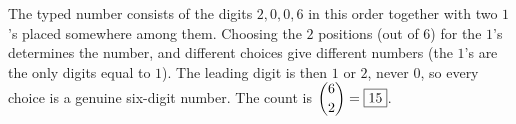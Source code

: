 The typed number consists of the digits $2,0,0,6$ in this order together with two $1$'s placed somewhere among them. Choosing the $2$ positions (out of $6$) for the $1$'s determines the number, and different choices give different numbers (the $1$'s are the only digits equal to $1$). The leading digit is then $1$ or $2$, never $0$, so every choice is a genuine six-digit number. The count is $\dbinom62=\boxed{15}$.
